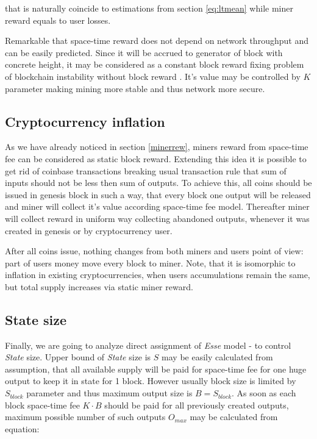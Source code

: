 \documentclass[]{article}   %
\newcommand{\authnote}[2]{\marginpar{\parbox{\marginparwidth}{\tiny %
  \textsf{#1 {\textcolor{blue}{notes: #2}}}}}%
  \textcolor{blue}{\textbf{\dag}}}
\newcommand{\authnote}[2]{
  \textsf{#1 \textcolor{blue}{: #2}}}
\newcommand{\authnote}[2]{}
\newcommand{\dnote}[1]{{\authnote{\textcolor{blue}{Dima notes}}{#1}}}
\newcommand{\esse}{\textit{Esse}}
\newcommand{\state}{\textit{State}}
\begin{document}
that is naturally coincide to estimations from section \ref{eq:ltmean} while miner reward equals to user losses.

Remarkable that space-time reward does not depend on network throughput and can be easily predicted. Since it will be accrued to generator of block with concrete height, it may be considered as a constant block reward fixing problem of blockchain instability without block reward \cite{carlsten2016instability}. It's value may be controlled by $K$ parameter making mining more stable and thus network more secure.

\dnote{What is an output value when miner is interested in collecting it?}

\subsection{Cryptocurrency inflation}

As we have already noticed in section \ref{minerrew}, miners reward from space-time fee can be considered as static block reward. Extending this idea it is possible to get rid of coinbase transactions breaking usual transaction rule that sum of inputs should not be less then sum of outputs. To achieve this, all coins should be issued in genesis block in such a way, that every block one output will be released and miner will collect it's value according space-time fee model. Thereafter miner will collect reward in uniform way collecting abandoned outputs, whenever it was created in genesis or by cryptocurrency user.

After all coins issue, nothing changes from both miners and users point of view: part of users money move every block to miner. Note, that it is isomorphic to inflation in existing cryptocurrencies, when users accumulations remain the same, but total supply increases via static miner reward.

\subsection{State size}

Finally, we are going to analyze direct assignment of \esse{} model - to control \state{} size. Upper bound of \state{} size is $S$ may be easily calculated from assumption, that all available supply will be paid for space-time fee for one huge output to keep it in state for 1 block. However usually block size is limited by $S_{block}$ parameter and thus maximum output size is $B = S_{block}$. As soon as each block space-time fee $K \cdot B$ should be paid for all previously created outputs, maximum possible number of such outputs $O_{max}$ may be calculated from equation:
\end{document}
